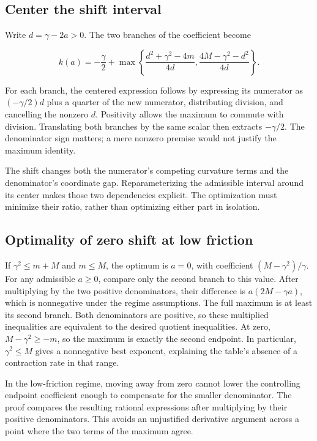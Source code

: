\documentclass[11pt,a4paper]{report}
\begin{document}
\subsection{\texorpdfstring{Center the shift interval}{Center the shift interval}}
\label{report-step-KineticLangevin-Friction-lean-1}


Write \(d=\gamma-2a>0\). The two branches of the coefficient become

\[k(a)=-\frac\gamma2+\max\left\{\frac{d^2+\gamma^2-4m}{4d},\frac{4M-\gamma^2-d^2}{4d}\right\}.\]

For each branch, the centered expression follows by expressing its numerator as \((-\gamma/2)d\) plus a quarter of the new numerator, distributing division, and cancelling the nonzero \(d\). Positivity allows the maximum to commute with division. Translating both branches by the same scalar then extracts \(-\gamma/2\). The denominator sign matters; a mere nonzero premise would not justify the maximum identity.



The shift changes both the numerator’s competing curvature terms and the denominator’s coordinate gap. Reparameterizing the admissible interval around its center makes those two dependencies explicit. The optimization must minimize their ratio, rather than optimizing either part in isolation.

\subsection{\texorpdfstring{Optimality of zero shift at low friction}{Optimality of zero shift at low friction}}
\label{report-step-KineticLangevin-Friction-lean-2}


If \(\gamma^2\le m+M\) and \(m\le M\), the optimum is \(a=0\), with coefficient \((M-\gamma^2)/\gamma\). For any admissible \(a\ge0\), compare only the second branch to this value. After multiplying by the two positive denominators, their difference is \(a(2M-\gamma a)\), which is nonnegative under the regime assumptions. The full maximum is at least its second branch. Both denominators are positive, so these multiplied inequalities are equivalent to the desired quotient inequalities. At zero, \(M-\gamma^2\ge-m\), so the maximum is exactly the second endpoint. In particular, \(\gamma^2\le M\) gives a nonnegative best exponent, explaining the table's absence of a contraction rate in that range.



In the low-friction regime, moving away from zero cannot lower the controlling endpoint coefficient enough to compensate for the smaller denominator. The proof compares the resulting rational expressions after multiplying by their positive denominators. This avoids an unjustified derivative argument across a point where the two terms of the maximum agree.
\end{document}
